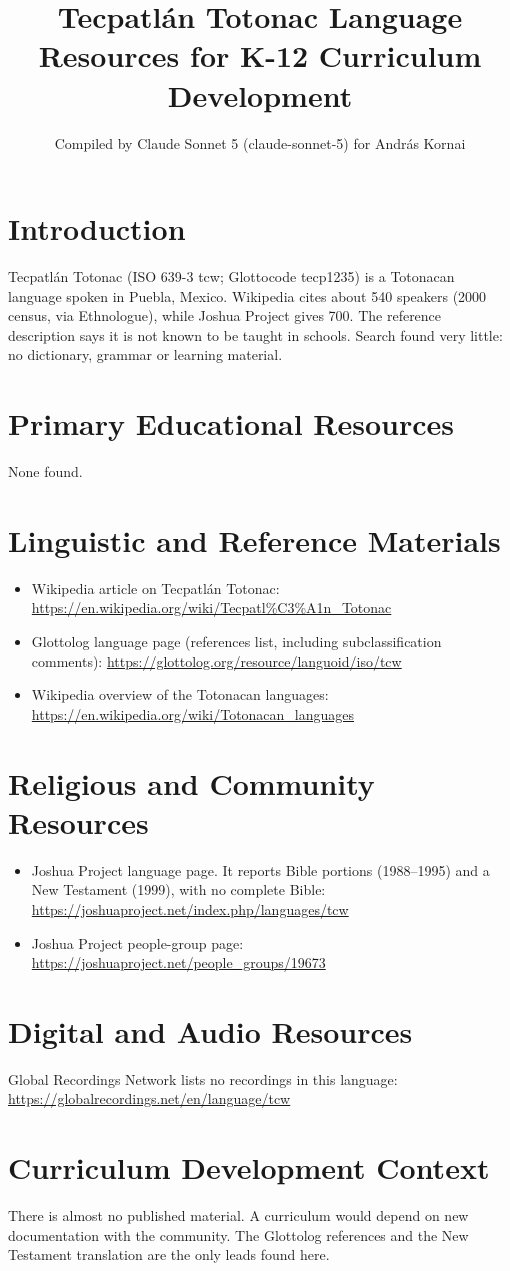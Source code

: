 \documentclass[12pt]{article}
\title{Tecpatl\'an Totonac Language Resources for K-12 Curriculum Development}
\author{Compiled by Claude Sonnet 5 (claude-sonnet-5) for Andr\'as Kornai}
\date{}
\begin{document}
\maketitle

\section{Introduction}
Tecpatl\'an Totonac (ISO 639-3 tcw; Glottocode tecp1235) is a Totonacan language spoken in Puebla, Mexico. Wikipedia cites about 540 speakers (2000 census, via Ethnologue), while Joshua Project gives 700. The reference description says it is not known to be taught in schools. Search found very little: no dictionary, grammar or learning material.

\section{Primary Educational Resources}
None found.

\section{Linguistic and Reference Materials}
\begin{itemize}
\item Wikipedia article on Tecpatl\'an Totonac: \url{https://en.wikipedia.org/wiki/Tecpatl%C3%A1n_Totonac}
\item Glottolog language page (references list, including subclassification comments): \url{https://glottolog.org/resource/languoid/iso/tcw}
\item Wikipedia overview of the Totonacan languages: \url{https://en.wikipedia.org/wiki/Totonacan_languages}
\end{itemize}

\section{Religious and Community Resources}
\begin{itemize}
\item Joshua Project language page. It reports Bible portions (1988--1995) and a New Testament (1999), with no complete Bible: \url{https://joshuaproject.net/index.php/languages/tcw}
\item Joshua Project people-group page: \url{https://joshuaproject.net/people_groups/19673}
\end{itemize}

\section{Digital and Audio Resources}
Global Recordings Network lists no recordings in this language: \url{https://globalrecordings.net/en/language/tcw}

\section{Curriculum Development Context}
There is almost no published material. A curriculum would depend on new documentation with the community. The Glottolog references and the New Testament translation are the only leads found here.
\end{document}
